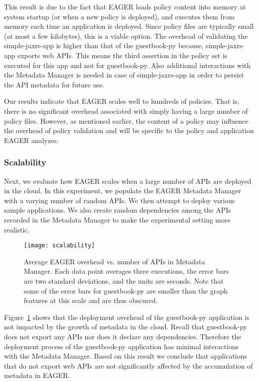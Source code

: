 This result is due to the fact that EAGER loads policy content into memory at system
startup (or when a new policy is deployed), and executes them from memory each
time an application is deployed. Since policy files are typically small (at
most a few kilobytes), this is a viable option. The overhead of validating the
simple-jaxrs-app is higher than that of the guestbook-py because,
simple-jaxrs-app exports web APIs. This means the third assertion in the
policy set is executed for this app and not for guestbook-py. Also additional
interactions with the Metadata Manager is needed in case of simple-jaxrs-app
in order to persist the API metadata for future use.

Our results indicate that EAGER scales well to hundreds of policies. That is,
there is no significant overhead associated with simply having a large number
of policy files. However, as mentioned earlier, the content of a policy may
influence the overhead of policy validation and will be specific to the policy and 
application EAGER analyzes.
 
\subsubsection{Scalability}
Next, we evaluate how EAGER scales when a large number of APIs are deployed 
in the cloud. In this experiment, we populate the EAGER
Metadata Manager with a varying number of random APIs. We then attempt to deploy various sample 
applications. We also create random dependencies among the APIs recorded in the 
Metadata Manager to make the experimental setting more realistic.

\begin{figure}
\centering
\texttt{[image: scalability]}
\caption{Average EAGER overhead vs. number of APIs in Metadata Manager.  Each
data point averages three executions, the error bars are two standard
deviations, and the units are seconds.  Note that some of the error bars for
guestbook-py are smaller than the graph features at this scale and are thus obscured.}
\label{fig:scalability}
\vspace{-0.2in}
\end{figure}

Figure~\ref{fig:scalability} shows that the deployment overhead of the 
guestbook-py application is not impacted by the growth of metadata
in the cloud. Recall that guestbook-py does not export any APIs nor does it 
declare any dependencies. Therefore the deployment process of
the guestbook-py application has minimal interactions with the 
Metadata Manager. Based on this result we conclude that applications that
do not export web APIs are not significantly affected by the accumulation 
of metadata in EAGER.

